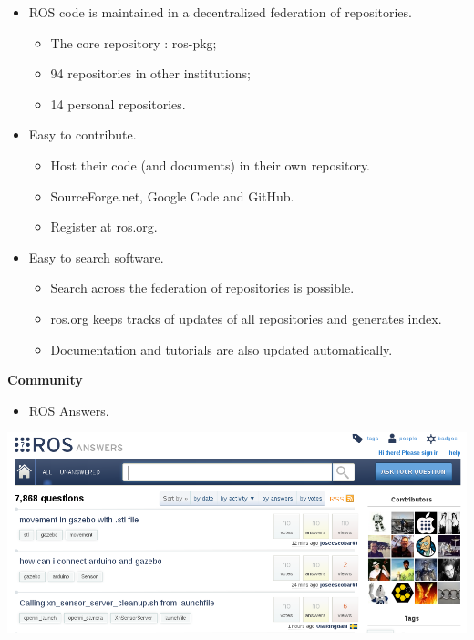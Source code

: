 \documentclass[a4paper, 11pt, conference]{ieeeconf}       %
\begin{document}
\begin{itemize}
  \item ROS code is maintained in a decentralized federation of repositories.
  \begin{itemize}
    \item The core repository : ros-pkg;
    \item 94 repositories in other institutions;
    \item 14 personal repositories.
  \end{itemize}
  \item Easy to contribute.
  \begin{itemize}
    \item Host their code (and documents) in their own repository.
    \item SourceForge.net, Google Code and GitHub.
    \item Register at ros.org.
  \end{itemize}
  \item Easy to search software.
  \begin{itemize}
    \item Search across the federation of repositories is possible.
    \item ros.org keeps tracks of updates of all repositories and generates index.
    \item Documentation and tutorials are also updated automatically.
  \end{itemize}
\end{itemize}




\textbf{Community}

\begin{itemize}
  \item ROS Answers.
\end{itemize}
\begin{center}
  \includegraphics[width=\textwidth]{ros_answers}
\end{center}
\end{document}
